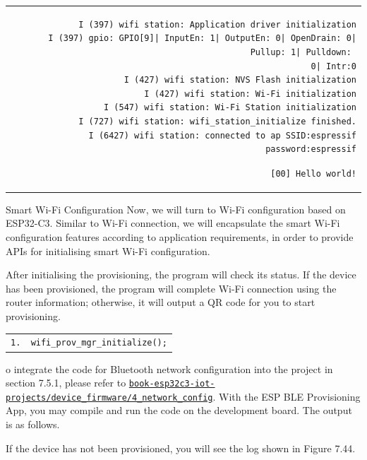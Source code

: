 \documentclass[a4paper,12pt,openany]{book}
\renewcommand{\ttfamily}{\fontfamily{pcr}\selectfont}
\renewcommand{\arraystretch}{1}
\newenvironment{codebloc}{ %
    \ttfamily\footnotesize
    \renewcommand{\arraystretch}{1}
}
\newcommand{\note}[2][NOTE]{ %
\vspace{6pt}
\begin{tabular}{b{\textwidth}}
\hline
\fontfamily{phv}\selectfont \textbf{#1}\\
\leftskip 1em #2\\
\hline
\end{tabular}
}
\begin{document}
\begin{codebloc}
\fontsize{9.7pt}{9.7pt}\selectfont
\begin{tabular}{d}
\vspace{2pt}
\begin{verbatim}
I (397) wifi station: Application driver initialization
I (397) gpio: GPIO[9]| InputEn: 1| OutputEn: 0| OpenDrain: 0| Pullup: 1| Pulldown: 
0| Intr:0
I (427) wifi station: NVS Flash initialization
I (427) wifi station: Wi-Fi initialization
I (547) wifi station: Wi-Fi Station initialization
I (727) wifi station: wifi_station_initialize finished.
I (6427) wifi station: connected to ap SSID:espressif password:espressif
\end{verbatim}
\verb|[00] Hello world!|
\end{tabular}
\end{codebloc}

\subsection{Smart Wi-Fi Configuration}
Now, we will turn to Wi-Fi configuration based on ESP32-C3. Similar to Wi-Fi connection, we will encapsulate the smart Wi-Fi configuration features according to application requirements, in order to provide APIs for initialising smart Wi-Fi configuration.

After initialising the provisioning, the program will check its status. If the device has been provisioned, the program will complete Wi-Fi connection using the router information; otherwise, it will output a QR code for you to start provisioning.

\begin{codebloc}
\begin{tabular}{d}
\verb|1.  wifi_prov_mgr_initialize();|
\end{tabular}
\end{codebloc}

To integrate the code for Bluetooth network configuration into the project in section 7.5.1, please refer to \href{https://github.com/espressif/book-esp32c3-iot-projects/tree/main/device_firmware/4_network_config}{\texttt{book-esp32c3-iot-projects/device\_firmware/4\_network\_config}}. With the ESP BLE Provisioning App, you may compile and run the code on the development board. The output is as follows.


If the device has not been provisioned, you will see the log shown in Figure 7.44.
\end{document}
